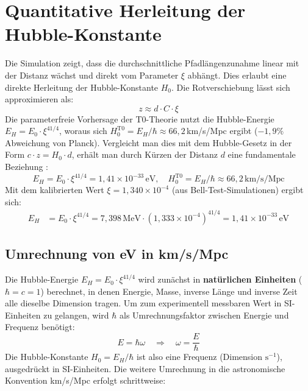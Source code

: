 	\section{Quantitative Herleitung der Hubble-Konstante}
	Die Simulation zeigt, dass die durchschnittliche Pfadlängenzunahme linear mit der Distanz wächst und direkt vom Parameter $\xi$ abhängt. Dies erlaubt eine direkte Herleitung der Hubble-Konstante $H_0$.
	Die Rotverschiebung lässt sich approximieren als:
	\begin{equation}
		z \approx d \cdot C \cdot \xi
	\end{equation}
	Die parameterfreie Vorhersage der T0-Theorie nutzt die Hubble-Energie $E_H = E_0 \cdot \xi^{41/4}$, woraus sich $H_0^{\text{T0}} = E_H/\hbar \approx 66{,}2\,$km/s/Mpc ergibt ($-1{,}9\%$ Abweichung von Planck).
	Vergleicht man dies mit dem Hubble-Gesetz in der Form $c \cdot z = H_0 \cdot d$, erhält man durch Kürzen der Distanz $d$ eine fundamentale Beziehung \cite{pascher:geometric_formalism}:
	\begin{equation}
		E_H = E_0 \cdot \xi^{41/4} = 1{,}41 \times 10^{-33}\,\text{eV}, \quad H_0^{\text{T0}} = E_H/\hbar \approx 66{,}2\,\text{km/s/Mpc}
	\end{equation}
	Mit dem kalibrierten Wert $\xi = 1{,}340 \times 10^{-4}$ (aus Bell-Test-Simulationen) ergibt sich:
	\begin{align*}
		E_H &= E_0 \cdot \xi^{41/4} = 7{,}398\,\text{MeV} \cdot (1{,}333 \times 10^{-4})^{41/4} = 1{,}41 \times 10^{-33}\,\text{eV}
	\end{align*}
	
	\subsection{Umrechnung von eV in km/s/Mpc}
	
	Die Hubble-Energie $E_H = E_0 \cdot \xi^{41/4}$ wird zunächst in \textbf{natürlichen Einheiten} ($\hbar = c = 1$) berechnet, in denen Energie, Masse, inverse Länge und inverse Zeit alle dieselbe Dimension tragen. Um zum experimentell messbaren Wert in SI-Einheiten zu gelangen, wird $\hbar$ als Umrechnungsfaktor zwischen Energie und Frequenz benötigt:
	\begin{equation}
		E = \hbar \omega \quad \Longrightarrow \quad \omega = \frac{E}{\hbar}
	\end{equation}
	Die Hubble-Konstante $H_0 = E_H/\hbar$ ist also eine Frequenz (Dimension $\text{s}^{-1}$), ausgedrückt in SI-Einheiten. Die weitere Umrechnung in die astronomische Konvention km/s/Mpc erfolgt schrittweise:
	
